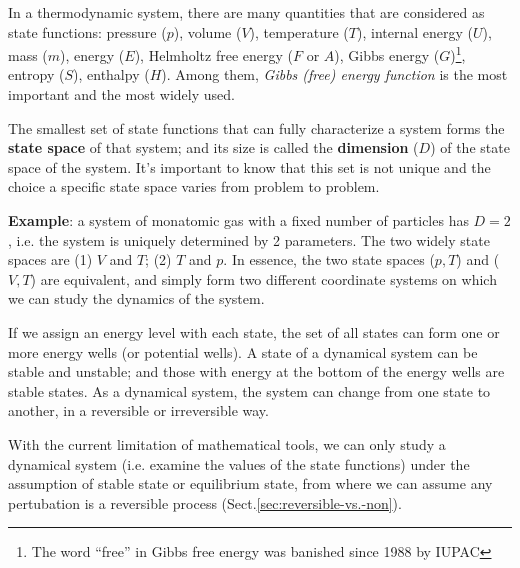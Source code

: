 \begin{mdframed}
  
  In a thermodynamic system, there are many quantities that are
  considered as state functions: pressure ($p$), volume ($V$),
  temperature ($T$), internal energy ($U$), mass ($m$), energy ($E$),
  Helmholtz free energy ($F$ or $A$), Gibbs energy ($G$)\footnote{The word
  ``free'' in Gibbs free energy was banished since 1988 by IUPAC},
  entropy ($S$), enthalpy ($H$).
  Among them, {\it Gibbs (free) energy function} is the most important and the
  most widely used. %
\end{mdframed}

The smallest set of state functions that can fully characterize a system forms
the {\bf state space} of that system; and its size is called the {\bf dimension}
($D$) of the state space of the system. It's important to know that this set is not
unique and the choice a specific state space varies from problem to problem. 

{\bf Example}: a system of monatomic gas with a fixed number of particles has $D
= 2$, i.e. the system is uniquely determined by 2 parameters. The two widely
state spaces are (1) $V$ and $T$; (2) $T$ and $p$. In essence, the two state
spaces ($p,T$) and ($V,T$) are equivalent, and simply form two different
coordinate systems on which we can study the dynamics of the system.

If we assign an energy level with each state, the set of all states can form one
or more energy wells (or potential wells). A state of a dynamical system can be
stable and unstable; and those with energy at the bottom of the energy wells are
stable states. As a dynamical system, the system can change from one state to
another, in a reversible or irreversible way.

With the current limitation of mathematical tools, we can only study a dynamical
system (i.e. examine the values of the state functions) under the assumption of
stable state or equilibrium state, from where we can assume any pertubation is a
reversible process (Sect.\ref{sec:reversible-vs.-non}).
  
